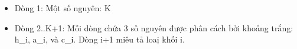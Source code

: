 \begin{itemize}
	\item Dòng 1: Một số nguyên: K
	\item Dòng 2..K+1: Mỗi dòng chứa 3 số nguyên được phân cách bởi khoảng trắng: h\_i, a\_i, và c\_i. Dòng i+1 miêu tả loaị khối i.
\end{itemize}

\